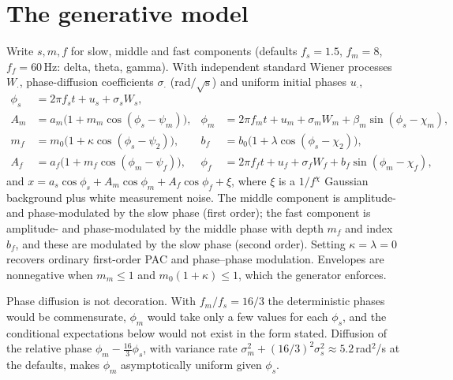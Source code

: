 \section{The generative model}
Write $s,m,f$ for slow, middle and fast components (defaults
$f_s=1.5$, $f_m=8$, $f_f=60$\,Hz: delta, theta, gamma). With independent
standard Wiener processes $W_\cdot$, phase-diffusion coefficients
$\sigma_\cdot$ (rad$/\sqrt{\mathrm s}$) and uniform initial phases
$u_\cdot$,
\begin{align*}
\phi_s&=2\pi f_st+u_s+\sigma_sW_s,\\
A_m&=a_m\bigl(1+m_m\cos(\phi_s-\psi_m)\bigr), &
\phi_m&=2\pi f_mt+u_m+\sigma_mW_m+\beta_m\sin(\phi_s-\chi_m),\\
m_f&=m_0\bigl(1+\kappa\cos(\phi_s-\psi_2)\bigr), &
b_f&=b_0\bigl(1+\lambda\cos(\phi_s-\chi_2)\bigr),\\
A_f&=a_f\bigl(1+m_f\cos(\phi_m-\psi_f)\bigr), &
\phi_f&=2\pi f_ft+u_f+\sigma_fW_f+b_f\sin(\phi_m-\chi_f),
\end{align*}
and $x=a_s\cos\phi_s+A_m\cos\phi_m+A_f\cos\phi_f+\xi$, where $\xi$ is a
$1/f^{\chi}$ Gaussian background plus white measurement noise. The middle
component is amplitude- and phase-modulated by the slow phase (first
order); the fast component is amplitude- and phase-modulated by the middle
phase with depth $m_f$ and index $b_f$, and these are modulated by the slow
phase (second order). Setting $\kappa=\lambda=0$ recovers ordinary
first-order PAC and phase--phase modulation. Envelopes are nonnegative
when $m_m\le1$ and $m_0(1+\kappa)\le1$, which the generator enforces.

Phase diffusion is not decoration. With $f_m/f_s=16/3$ the deterministic
phases would be commensurate, $\phi_m$ would take only a few values for
each $\phi_s$, and the conditional expectations below would not exist in
the form stated. Diffusion of the relative phase
$\phi_m-\tfrac{16}{3}\phi_s$, with variance rate
$\sigma_m^2+(16/3)^2\sigma_s^2\approx5.2$\,rad$^2$/s at the defaults,
makes $\phi_m$ asymptotically uniform given $\phi_s$.

